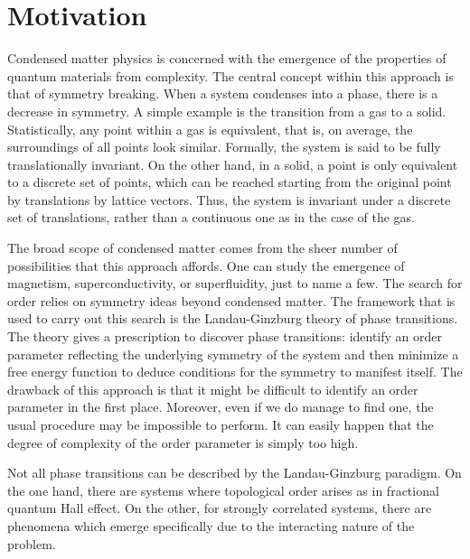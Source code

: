\section{Motivation}
\label{sec:int_motivation}

Condensed matter physics is concerned with the emergence of the properties of quantum materials from complexity. The central concept within this approach is that of symmetry breaking. When a system condenses into a phase, there is a decrease in symmetry. A simple example is the transition from a gas to a solid. Statistically, any point within a gas is equivalent, that is, on average, the surroundings of all points look similar. Formally, the system is said to be fully  translationally invariant. On the other hand, in a solid, a point is only equivalent to a discrete set of points, which can be reached starting from the original point by translations by lattice vectors. Thus, the system is invariant under a discrete set of translations, rather than a continuous one as in the case of the gas.

The broad scope of condensed matter comes from the sheer number of possibilities that this approach affords. One can study the emergence of magnetism, superconductivity, or superfluidity, just to name a few. The search for order relies on symmetry ideas beyond condensed matter. The framework that is used to carry out this search is the Landau-Ginzburg theory of phase transitions. The theory gives a prescription to discover phase transitions: identify an order parameter reflecting the underlying symmetry of the system and then minimize a free energy function to deduce conditions for the symmetry to manifest itself. The drawback of this approach is that it might be difficult to identify an order parameter in the first place. Moreover, even if we do manage to find one, the usual procedure may be impossible to perform. It can easily happen that the degree of complexity of the order parameter is simply too high.

Not all phase transitions can be described by the Landau-Ginzburg paradigm. On the one hand, there are systems where topological order arises as in fractional quantum Hall effect. On the other, for strongly correlated systems, there are phenomena which emerge specifically due to the interacting nature of the problem.